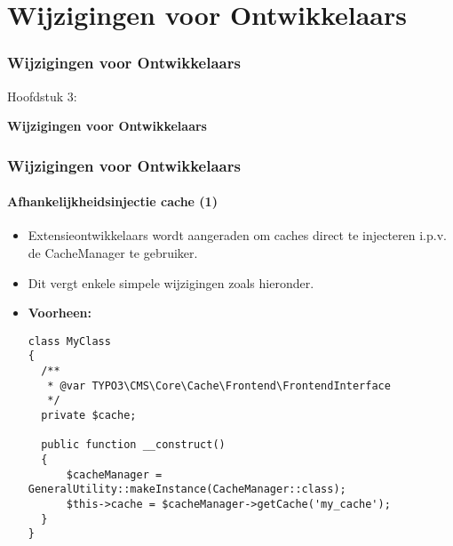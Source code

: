 %

\section{Wijzigingen voor Ontwikkelaars}
\begin{frame}[fragile]
	\frametitle{Wijzigingen voor Ontwikkelaars}

	\begin{center}\huge{Hoofdstuk 3:}\end{center}
	\begin{center}\huge{\color{typo3darkgrey}\textbf{Wijzigingen voor Ontwikkelaars}}\end{center}

\end{frame}


\begin{frame}[fragile]
	\frametitle{Wijzigingen voor Ontwikkelaars}
	\framesubtitle{Afhankelijkheidsinjectie cache (1)}

	\lstset{basicstyle=\tiny\ttfamily}

	\begin{itemize}
		\item Extensieontwikkelaars wordt aangeraden om caches direct te injecteren i.p.v. de CacheManager
			te gebruiker.
		\item Dit vergt enkele simpele wijzigingen zoals hieronder.

		\item \textbf{Voorheen:}

\begin{lstlisting}
class MyClass
{
  /**
   * @var TYPO3\CMS\Core\Cache\Frontend\FrontendInterface
   */
  private $cache;

  public function __construct()
  {
      $cacheManager = GeneralUtility::makeInstance(CacheManager::class);
      $this->cache = $cacheManager->getCache('my_cache');
  }
}
\end{lstlisting}

	\end{itemize}

\end{frame}

